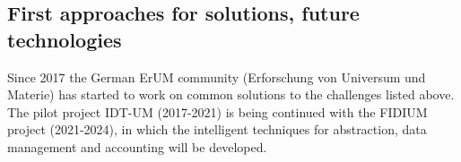 \subsection{First approaches for solutions, future technologies}
Since 2017 the German ErUM community (Erforschung von Universum und
Materie) has started to work on common solutions to the challenges
listed above. The pilot project IDT-UM (2017-2021) is being continued
with the FIDIUM project (2021-2024), in which the intelligent
techniques for abstraction, data management and accounting will be
developed.
